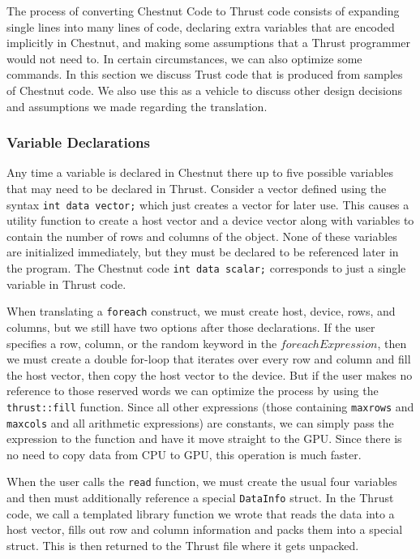 \documentclass[twocolumn]{article}
\renewcommand{\|}{\origbar} %
\newcommand{\code}[1]{\texttt{#1}}
\begin{document}

The process of converting Chestnut Code to Thrust code consists of expanding single lines into many lines of code, declaring extra variables that are encoded implicitly in Chestnut, and making some assumptions that a Thrust programmer would not need to. In certain circumstances, we can also optimize some commands. In this section we discuss Trust code that is produced from samples of Chestnut code. We also use this as a vehicle to discuss other design decisions and assumptions we made regarding the translation.

\subsubsection{Variable Declarations}

Any time a variable is declared in Chestnut there up to five possible variables that may need to be declared in Thrust. Consider a vector defined using the syntax \code{int data vector;} which just creates a vector for later use. This causes a utility function to create a host vector and a device vector along with variables to contain the number of rows and columns of the object. None of these variables are initialized immediately, but they must be declared to be referenced later in the program. The Chestnut code \code{int data scalar;} corresponds to just a single variable in Thrust code.

When translating a \code{foreach} construct, we must create host, device, rows, and columns, but we still have two options after those declarations. If the user specifies a row, column, or the random keyword in the $foreachExpression$, then we must create a double for-loop that iterates over every row and column and fill the host vector, then copy the host vector to the device. But if the user makes no reference to those reserved words we can optimize the process by using the \code{thrust::fill} function. Since all other expressions (those containing \code{maxrows} and \code{maxcols} and all arithmetic expressions) are constants, we can simply pass the expression to the function and have it move straight to the GPU. Since there is no need to copy data from CPU to GPU, this operation is much faster.

When the user calls the \code{read} function, we must create the usual four variables and then must additionally reference a special \code{DataInfo} struct. In the Thrust code, we call a templated library function we wrote that reads the data into a host vector, fills out row and column information and packs them into a special struct. This is then returned to the Thrust file where it gets unpacked.
\end{document}
